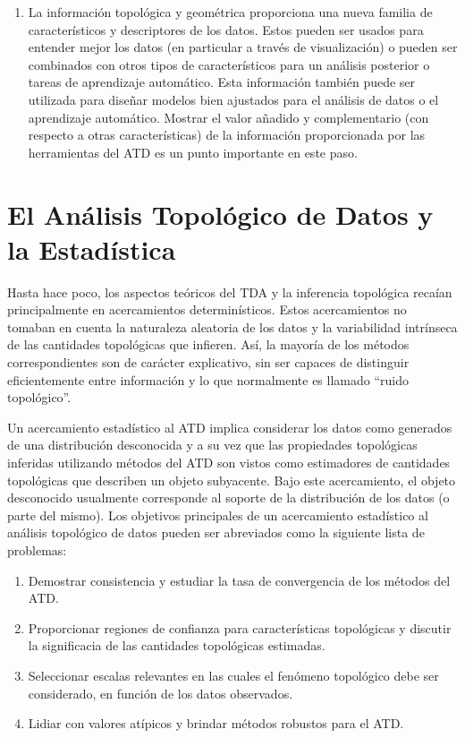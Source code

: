 \begin{enumerate}
    \item La informaci\'on topol\'ogica y geom\'etrica proporciona una nueva familia de
    caracter\'isticos y descriptores de los datos. Estos pueden ser usados para entender mejor
    los datos (en particular a trav\'es de visualizaci\'on) o pueden ser combinados con otros
    tipos de caracter\'isticos para un an\'alisis posterior o tareas de aprendizaje autom\'atico.
    Esta informaci\'on tambi\'en puede ser utilizada para dise\~{n}ar modelos bien ajustados para el
    an\'alisis de datos o el aprendizaje autom\'atico. Mostrar el valor a\~{n}adido y complementario
    (con respecto a otras caracter\'isticas) de la informaci\'on proporcionada por las
    herramientas del ATD es un punto importante en este paso.
    
\end{enumerate}

\section*{El An\'alisis Topol\'ogico de Datos y la Estad\'istica}

Hasta hace poco, los aspectos te\'oricos del TDA y la inferencia topol\'ogica reca\'ian
principalmente en acercamientos determin\'isticos. Estos acercamientos no tomaban en cuenta la
naturaleza aleatoria de los datos y la variabilidad intr\'inseca de las cantidades topol\'ogicas
que infieren. As\'i, la mayor\'ia de los m\'etodos correspondientes son de car\'acter explicativo,
sin ser capaces de distinguir eficientemente entre informaci\'on y lo que normalmente es llamado
``ruido topol\'ogico''.

Un acercamiento estad\'istico al ATD implica considerar los datos como generados de una
distribuci\'on desconocida y a su vez que las propiedades topol\'ogicas inferidas utilizando
m\'etodos del ATD son vistos como estimadores de cantidades topol\'ogicas que describen un
objeto subyacente. Bajo este acercamiento, el objeto desconocido usualmente corresponde al soporte
de la distribuci\'on de los datos (o parte del mismo). Los objetivos principales de un acercamiento
estad\'istico al an\'alisis topol\'ogico de datos pueden ser abreviados como la siguiente lista
de problemas:

\begin{enumerate}[label=\emph{T\'opico \arabic*:}]
    \item Demostrar consistencia y estudiar la tasa de convergencia de los m\'etodos del ATD.
    
    \item Proporcionar regiones de confianza para caracter\'isticas topol\'ogicas y discutir la
    significacia de las cantidades topol\'ogicas estimadas.
    
    \item Seleccionar escalas relevantes en las cuales el fen\'omeno topol\'ogico debe ser considerado,
    en funci\'on de los datos observados.
    
    \item Lidiar con valores at\'ipicos y brindar m\'etodos robustos para el ATD.
    
\end{enumerate}

